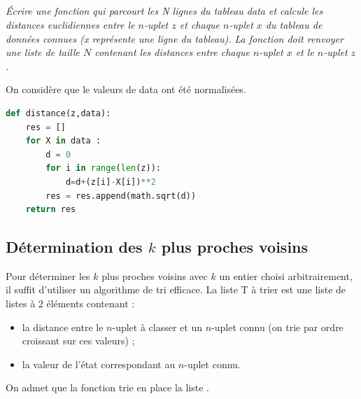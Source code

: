 \subparagraph{}\textit{Écrire une fonction  qui parcourt les N lignes du tableau data et calcule
les distances euclidiennes entre le $n$-uplet $z$ et chaque $n$-uplet $x$ du tableau de données connues
(x représente une ligne du tableau). La fonction doit renvoyer une liste de taille $N$ contenant
les distances entre chaque $n$-uplet $x$ et le $n$-uplet $z$.}
\ifprof
\begin{corrige}
On considère que le valeurs de data ont été normalisées.

\begin{lstlisting}[language=Python]
def distance(z,data):
    res = []
    for X in data :
        d = 0
        for i in range(len(z)):
            d=d+(z[i]-X[i])**2
        res = res.append(math.sqrt(d))
    return res
\end{lstlisting}

\end{corrige}
\else
\fi

\subsection*{Détermination des $k$ plus proches voisins}

\ifprof
\else
Pour déterminer les $k$ plus proches voisins avec $k$ un entier choisi arbitrairement, il suffit d’utiliser
un algorithme de tri efficace. La liste T à trier est une liste de listes à 2 éléments contenant :
\begin{itemize}
\item la distance entre le $n$-uplet à classer et un $n$-uplet connu (on trie par ordre croissant sur ces
valeurs) ;
\item la valeur de l’état correspondant au $n$-uplet connu.
\end{itemize}

On admet que la fonction  trie en place la liste .
%
%
%

